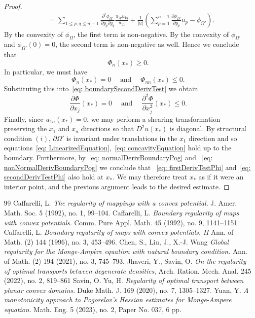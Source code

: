 \documentclass[10pt,a4paper]{amsart}
\newcommand{\del}{\partial}
\numberwithin{equation}{section}
\begin{document}
\begin{proof}
\[\begin{aligned}
&= \sum_{1 \leq p,q \leq n-1}\frac{\del^2 \phi_{\Omega'}}{\del y_p\del y_q}\frac{u_{1p}u_{1q}}{u_{11}} +\frac{1}{|u|} \left(\sum_{p=1}^{n-1}\frac{\del \phi_{\Omega'}}{\del y_p}u_p - \phi_{\Omega'}\right).
\end{aligned}
\]
By the convexity of $\phi_{\Omega}$, the first term is non-negative. By the convexity of $\phi_{\Omega'}$ and $\phi_{\Omega'}(0) = 0$, the second term is non-negative as well. Hence we conclude that
\[
\Phi_{n}(x_*) \geq 0. 
\]
In particular, we must have
\begin{equation}\label{eq: normalDerivBoundaryPog}
\Phi_{n}(x_*)=0 \quad \text{ and } \quad  \Phi_{nn}(x_*) \leq 0.
\end{equation}
Substituting this into~\eqref{eq: boundarySecondDerivTest} we obtain
\begin{equation}\label{eq: nonNormalDerivBoundaryPog}
\frac{\del \Phi}{\del x_j}(x_*)=0 \quad \text{ and } \quad \frac{\del^2 \Phi}{\del x_j^2}(x_*) \leq 0. 
\end{equation}
Finally, since $u_{1n}(x_*)=0$, we may perform a shearing transformation preserving the $x_1$ and $x_n$ directions so that $D^2u(x_*)$ is diagonal.  By structural condition $(i)$, $\del \Omega'$ is invariant under translations in the $x_1$ direction and so equations~\eqref{eq: LinearizedEquation},~\eqref{eq: concavityEquation} hold up to the boundary.  Furthermore, by~\eqref{eq: normalDerivBoundaryPog} and ~\eqref{eq: nonNormalDerivBoundaryPog} we conclude that ~\eqref{eq: firstDerivTestPhi} and~\eqref{eq: secondDerivTestPhi} also hold at $x_*$.  We may therefore treat $x_*$ as if it were an interior point, and the previous argument leads to the desired estimate.
\end{proof}

\begin{thebibliography}{99}
 Caffarelli, L. {\em The regularity of mappings with a convex potential.} J. Amer. Math. Soc. 5 (1992), no. 1, 99–104. 
 Caffarelli, L. {\em Boundary regularity of maps with convex potentials.} Comm. Pure Appl. Math. 45 (1992), no. 9, 1141--1151 
 Caffarelli, L. {\em Boundary regularity of maps with convex potentials. II} Ann. of Math. (2) 144 (1996), no. 3, 453–496. 
 Chen, S., Liu, J., X.-J. Wang {\em Global regularity for the Monge-Ampère equation with natural boundary condition.} Ann. of Math. (2) 194 (2021), no. 3, 745–793. 
 Jhaveri, Y., Savin, O. {\em On the regularity of optimal transports between degenerate densities}, Arch. Ration. Mech. Anal. 245 (2022), no. 2, 819--861 
 Savin, O. Yu, H. {\em Regularity of optimal transport between planar convex domains. } Duke Math. J. 169 (2020), no. 7, 1305–1327. 
 Yuan, Y. {\em A monotonicity approach to Pogorelov's Hessian estimates for Monge-Ampere equation. } Math. Eng. 5 (2023), no. 2, Paper No. 037, 6 pp.
\end{thebibliography}
\end{document}
